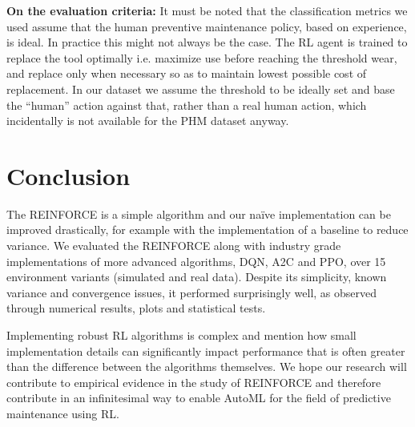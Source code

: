 \documentclass[a4paper, 12pt]{article}
\begin{document}
\textbf{On the evaluation criteria:} It must be noted that the classification metrics we used assume that the human preventive maintenance policy, based on experience, is ideal. In practice this might not always be the case. The RL agent is trained to replace the tool optimally i.e. maximize use before reaching the threshold wear, and replace only when necessary so as to maintain lowest possible cost of replacement. In our dataset we assume the threshold to be ideally set and base the ``human'' action against that, rather than a real human action, which incidentally is not available for the PHM dataset anyway.


 

\section{Conclusion}\label{sec:Conclusion}
The REINFORCE is a simple algorithm and our na\"ive implementation can be improved drastically, for example with the implementation of a baseline to reduce variance. We evaluated the REINFORCE along with industry grade implementations of more advanced algorithms, DQN, A2C and PPO, over 15 environment variants (simulated and real data). Despite its simplicity, known variance and convergence issues, it performed surprisingly well, as observed through numerical results, plots and statistical tests. 

Implementing robust RL algorithms is complex and \cite{SB3-paper} mention how small implementation details can significantly impact performance that is often greater than the difference between the algorithms themselves. We hope our research will contribute to empirical evidence in the study of REINFORCE and therefore contribute in an infinitesimal way to enable AutoML for the field of predictive maintenance using RL. %
\end{document}
